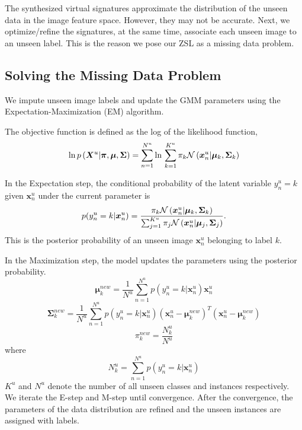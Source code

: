 \documentclass{article}
\begin{document}
The synthesized virtual signatures approximate the distribution of the unseen data in the image feature space. However, they may not be accurate. Next, we optimize/refine the signatures, at the same time, associate each unseen image to an unseen label. This is the reason we pose our ZSL as a missing data problem.



\subsection{Solving the Missing Data Problem}
We impute unseen image labels and update the GMM parameters using the Expectation-Maximization (EM) algorithm.

The objective function is defined as the log of the likelihood function,
\begin{equation}
\ln{p\left( {{\bm{X}^u}|{\bm{\pi}, \bm{\mu}},\bm{\Sigma} } \right)} = \sum_{n=1}^{N^u}{\ln{}} \sum\limits_{k = 1}^{K^u} {{\pi _k}{\cal N}\left( {{\bm{x}^u_n}|{\bm{\mu}_k},{\bm{\Sigma} _k}} \right)}
\end{equation}

In the Expectation step, the conditional probability of the latent variable $y^u_n=k$ given $\bm{x}^u_n$ under the current parameter is
\begin{equation}
p(y^u_n=k | \bm{x}^u_n) = \frac{{\pi _k}{\cal N}\left( {{\bm{x}^u_n}|{\bm{\mu}_k},{\bm{\Sigma} _k}} \right)}{\sum_{j=1}^{K^u}{{\pi _j}{\cal N}\left( {{\bm{x}^u_n}|{\bm{\mu}_j},{\bm{\Sigma} _j}} \right)}}.
\end{equation}
This is the posterior probability of an unseen image $\bm{x}^u_n$ belonging to label $k$.

In the Maximization step, the model updates the parameters using the posterior probability.
\begin{equation}
\bm{\mu}_k^{new} = \frac{1}{N^u} \sum_{n=1}^{N^u}{p(y^u_n=k | \bm{x}^u_n) \bm{x}^u_n}
\end{equation}
\begin{equation}
\bm{\Sigma}_k^{new} = \frac{1}{N^u} \sum_{n=1}^{N^u}{p(y^u_n=k | \bm{x}^u_n) (\bm{x}^u_n-\bm{\mu}_k^{new})^T(\bm{x}^u_n-\bm{\mu}_k^{new})}
\end{equation}
\begin{equation}
\pi^{new}_k = \frac{N^u_k}{N^u}
\end{equation}
where
\begin{equation}
N^u_k = \sum_{n=1}^{N^u}{p(y^u_n=k | \bm{x}^u_n)}
\end{equation}
$K^u$ and $N^u$ denote the number of all unseen classes and instances respectively. We iterate the E-step and M-step until convergence. After the convergence, the parameters of the data distribution are refined and the unseen instances are assigned with labels.
\end{document}
